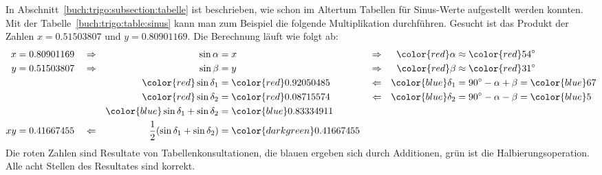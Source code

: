 \begin{beispiel}
In Abschnitt~\ref{buch:trigo:subsection:tabelle} ist beschrieben, wie
schon im Altertum Tabellen für Sinus-Werte aufgestellt werden konnten.
Mit der Tabelle~\ref{buch:trigo:table:sinus} kann man zum Beispiel die
folgende Multiplikation durchführen.
Gesucht ist das Produkt der Zahlen $x=0.51503807$ und $y=0.80901169$.
Die Berechnung läuft wie folgt ab:
\begin{align*}
x&=0.80901169&
&\Rightarrow&\sin\alpha  &=x&
&\Rightarrow&{\color{red}\alpha}&\approx {\color{red}54^\circ}
\\
y&=0.51503807&
&\Rightarrow&\sin\beta   &=y&
&\Rightarrow&{\color{red}\beta}&\approx {\color{red}31^\circ}
\\
 &          &
&           &{\color{red}\sin\delta_1}&={\color{red}0.92050485}&
&\Leftarrow &{\color{blue}\delta_1}&=90^\circ-\alpha+\beta={\color{blue}67}
\\
 &          &
&           &{\color{red}\sin\delta_2}&={\color{red}0.08715574}&
&\Leftarrow &{\color{blue}\delta_2}&=90^\circ-\alpha-\beta={\color{blue}5}
\\
 &&
 &          &{\color{blue}\sin\delta_1+\sin\delta_2}&={\color{blue}0.83334911}
\\
xy&=0.41667455&
 &\Leftarrow&\frac12(\sin\delta_1+\sin\delta_2)&={\color{darkgreen}0.41667455}
\end{align*}
Die roten Zahlen sind Resultate von Tabellenkonsultationen, die blauen
ergeben sich durch Additionen, grün ist die Halbierungsoperation.
Alle acht Stellen des Resultates sind korrekt.
\end{beispiel}

